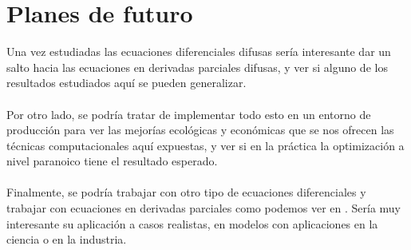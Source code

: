 \section{Planes de futuro}
Una vez estudiadas las ecuaciones diferenciales difusas sería interesante dar un salto hacia las ecuaciones en derivadas parciales difusas, y ver si alguno de los resultados estudiados aquí se pueden generalizar.
\\ \\
Por otro lado, se podría tratar de implementar todo esto en un entorno de producción para ver las mejorías ecológicas y económicas que se nos ofrecen las técnicas computacionales aquí expuestas, y ver si en la práctica la optimización a nivel paranoico tiene el resultado esperado. \\ \\
Finalmente, se podría trabajar con otro tipo de ecuaciones diferenciales y trabajar con ecuaciones en derivadas parciales como podemos ver en \cite{difffuzzy2}. Sería muy interesante su aplicación a casos realistas, en modelos con aplicaciones en la ciencia o en la industria.